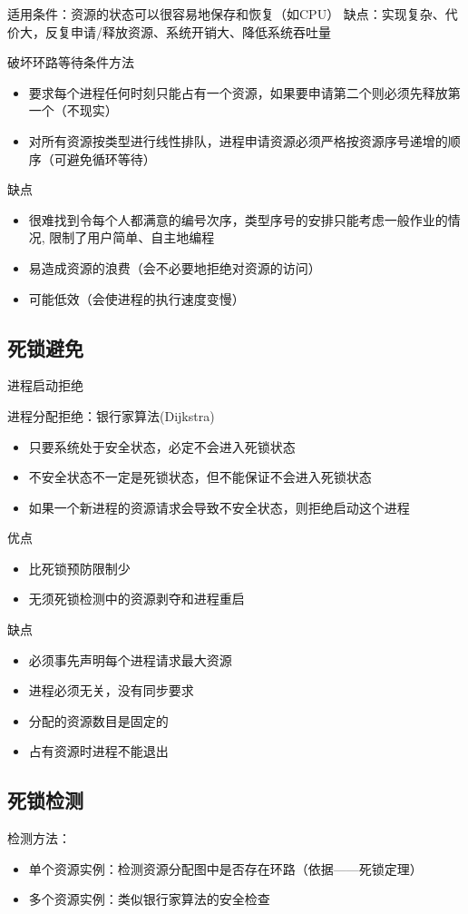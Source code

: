 适用条件：资源的状态可以很容易地保存和恢复（如CPU）
缺点：实现复杂、代价大，反复申请/释放资源、系统开销大、降低系统吞吐量

破坏环路等待条件方法
\begin{itemize}
    \item 要求每个进程任何时刻只能占有一个资源，如果要申请第二个则必须先释放第一个（不现实）
    \item 对所有资源按类型进行线性排队，进程申请资源必须严格按资源序号递增的顺序（可避免循环等待）
\end{itemize}

缺点
\begin{itemize}
    \item 很难找到令每个人都满意的编号次序，类型序号的安排只能考虑一般作业的情况, 限制了用户简单、自主地编程
    \item 易造成资源的浪费（会不必要地拒绝对资源的访问）
    \item 可能低效（会使进程的执行速度变慢）
\end{itemize}

\subsection{死锁避免}
进程启动拒绝

进程分配拒绝：银行家算法(Dijkstra)
\begin{itemize}
    \item 只要系统处于安全状态，必定不会进入死锁状态
    \item 不安全状态不一定是死锁状态，但不能保证不会进入死锁状态
    \item 如果一个新进程的资源请求会导致不安全状态，则拒绝启动这个进程
\end{itemize}

优点
\begin{itemize}
    \item 比死锁预防限制少
    \item 无须死锁检测中的资源剥夺和进程重启
\end{itemize}
缺点
\begin{itemize}
    \item 必须事先声明每个进程请求最大资源
    \item 进程必须无关，没有同步要求
    \item 分配的资源数目是固定的
    \item 占有资源时进程不能退出
\end{itemize}

\subsection{死锁检测}
检测方法：
\begin{itemize}
    \item 单个资源实例：检测资源分配图中是否存在环路（依据——死锁定理）
    \item 多个资源实例：类似银行家算法的安全检查
\end{itemize}

